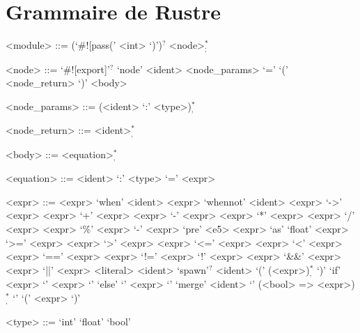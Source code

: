 \documentclass{scrartcl}
\DeclareMathOperator{\tint}{int}
\newlength{\figwidth}
\newcommand{\typerule}[2]{%
  \savebox{\rulebox}{$\displaystyle\frac{#1}{#2}$}
  \settowidth{\figwidth}{\usebox{\rulebox}}
  \begin{subcaption}{\the\figwidth}
    \usebox{\rulebox}
  \end{subcaption}
}
\begin{document}
\pagebreak
\appendix
{}

\section{Grammaire de Rustre}
\begin{grammar}
  <module> ::= (`#![pass(' <int> `)')${}^?$ <node>${}^*_;$

  <node> ::= `#![export]'${}^?$ `node' <ident> <node\_params> `=' `(' <node\_return> `)' <body>

  <node\_params> ::= (<ident> `:' <type>)${}^*_,$

  <node\_return> ::= <ident>${}^*_,$

  <body> ::= <equation>${}^*_,$

  <equation> ::= <ident> `:' <type> `=' <expr>

  <expr> ::= <expr> `when' <ident>
  \alt <expr> `whennot' <ident>
  \alt <expr> `->' <expr>
  \alt <expr> `+' <expr>
  \alt <expr> `-' <expr>
  \alt <expr> `*' <expr>
  \alt <expr> `/' <expr>
  \alt <expr> `\%' <expr>
  \alt `-' <expr>
  \alt `pre' <e5>
  \alt <expr> `as' `float'
  \alt <expr> `>=' <expr>
  \alt <expr> `>' <expr>
  \alt <expr> `<=' <expr>
  \alt <expr> `<' <expr>
  \alt <expr> `==' <expr>
  \alt <expr> `!=' <expr>
  \alt `!' <expr>
  \alt <expr> `&&' <expr>
  \alt <expr> `||' <expr>
  \alt <literal>
  \alt <ident>
  \alt `spawn'$^?$ <ident> `(' (<expr>)${}^*_,$ `)'
  \alt `if' <expr> `{' <expr> `}' `else' `{' <expr> `}'
  \alt `merge' <ident> `{' (<bool> => <expr>)${}^*_,$ `}'
  \alt `(' <expr> `)'

  <type> ::= `int'
  \alt `float'
  \alt `bool'
\end{grammar}

\end{document}
